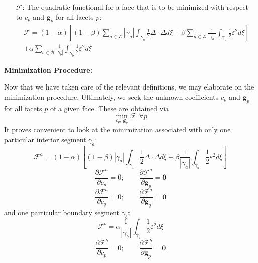 \documentclass[11pt]{article} %
\begin{document}
\begin{itemize}
	\item[$\mathcal{F}$:] The quadratic functional for a face that is to be minimized with respect to $c_p$ and $\mathbf{g}_p$ for all facets $p$:
	\begin{eqnarray}
	\mathcal{F} = (1-\alpha) \left[ (1-\beta) \sum_{a \in \mathcal{L}} | \gamma_a | \int_{\gamma_a} \frac{1}{2} \Delta \cdot \Delta d \xi + \beta \sum_{a \in \mathcal{L}} \frac{1}{| \gamma_a |} \int_{\gamma_a} \frac{1}{2} \varepsilon^2 d \xi \right] \nonumber \\ + \alpha \sum_{b \in \mathcal{B}} \frac{1}{| \gamma_b |} \int_{\gamma_b} \frac{1}{2} \varepsilon^2 d \xi
\end{eqnarray}
\end{itemize}

\begin{center}
\textbf{Minimization Procedure:}
\end{center}

Now that we have taken care of the relevant definitions, we may elaborate on the minimization procedure. Ultimately, we seek the unknown coefficients $c_p$ and $\mathbf{g}_p$ for all facets $p$ of a given face. These are obtained via
\begin{equation}
	\min_{c_p, \, \mathbf{g}_p} \mathcal{F} \, \, \forall p
\end{equation}
It proves convenient to look at the minimization associated with only one particular interior segment $\gamma_a$:
\begin{equation}
	\mathcal{F}^a = (1-\alpha) \left[ (1-\beta) | \gamma_a | \int_{\gamma_a} \frac{1}{2} \Delta \cdot \Delta d \xi + \beta \frac{1}{| \gamma_a |} \int_{\gamma_a} \frac{1}{2} \varepsilon^2 d \xi \right]
\end{equation}
\begin{equation}
	\frac{\partial \mathcal{F}^a}{\partial c_p} = 0; \qquad \frac{\partial \mathcal{F}^a}{\partial \mathbf{g}_p} = \mathbf{0}
\end{equation}
\begin{equation}
	\frac{\partial \mathcal{F}^a}{\partial c_q} = 0; \qquad \frac{\partial \mathcal{F}^a}{\partial \mathbf{g}_q} = \mathbf{0}
\end{equation}
and one particular boundary segment $\gamma_b$:
\begin{equation}
	\mathcal{F}^b = \alpha \frac{1}{| \gamma_b |} \int_{\gamma_b} \frac{1}{2} \varepsilon^2 d \xi
\end{equation}
\begin{equation}
	\frac{\partial \mathcal{F}^b}{\partial c_p} = 0; \qquad \frac{\partial \mathcal{F}^b}{\partial \mathbf{g}_p} = \mathbf{0}
\end{equation}
\end{document}
